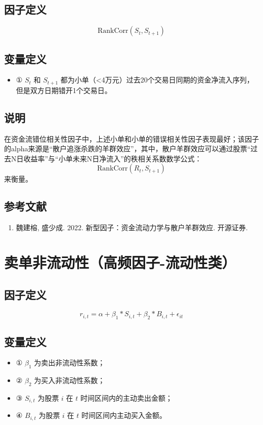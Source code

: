 \documentclass{article}
\begin{document}
\subsection{因子定义}

\begin{equation}
    \mathrm{RankCorr}(S_t, S_{t+1})
\end{equation}

\subsection{变量定义}
\begin{itemize}
    \item ① \( S_t \) 和 \( S_{t+1} \) 都为小单（<4万元）过去20个交易日同期的资金净流入序列，但是双方日期错开1个交易日。
\end{itemize}

\subsection{说明}
在资金流错位相关性因子中，上述小单和小单的错误相关性因子表现最好；该因子的alpha来源是“散户追涨杀跌的羊群效应”，其中，散户羊群效应可以通过股票“过去N日收益率”与“小单未来N日净流入”的秩相关系数数学公式：
\begin{equation}
    \mathrm{RankCorr}(R_t, S_{t+1})
\end{equation}
来衡量。

\subsection{参考文献}
\begin{enumerate}
    \item 魏建榕, 盛少成. 2022. 新型因子：资金流动力学与散户羊群效应. 开源证券.
\end{enumerate}

\section{卖单非流动性（高频因子-流动性类）}

\subsection{因子定义}
\begin{equation}
    r_{i,t} = \alpha + \beta_1 * S_{i,t} + \beta_2 * B_{i,t} + \epsilon_{it}
\end{equation}

\subsection{变量定义}
\begin{itemize}
    \item ① \( \beta_1 \) 为卖出非流动性系数；
    \item ② \( \beta_2 \) 为买入非流动性系数；
    \item ③ \( S_{i,t} \) 为股票 \( i \) 在 \( t \) 时间区间内的主动卖出金额；
    \item ④ \( B_{i,t} \) 为股票 \( i \) 在 \( t \) 时间区间内主动买入金额。
\end{itemize}
\end{document}
